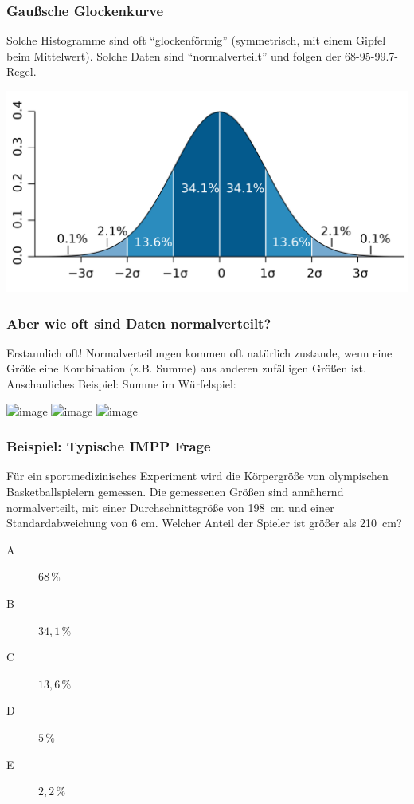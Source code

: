 \documentclass{beamer}
\begin{document}
\begin{frame}
\frametitle{Gaußsche Glockenkurve}

Solche Histogramme sind oft ``glockenförmig'' (symmetrisch, mit einem Gipfel beim Mittelwert). Solche Daten sind ``normalverteilt'' und folgen der 68-95-99.7-Regel.


\begin{center}
\includegraphics[width=\textwidth]{empirical_rule.png}
\end{center}





\end{frame}

\begin{frame}
\frametitle{Aber wie oft sind Daten normalverteilt?}

Erstaunlich oft! Normalverteilungen kommen oft natürlich zustande, wenn eine Größe eine Kombination (z.B. Summe) aus anderen zufälligen Größen ist. Anschauliches Beispiel: Summe im Würfelspiel:

\begin{center}
\includegraphics<1>[width=0.8\textwidth]{onedie.png}
\includegraphics<2>[width=0.8\textwidth]{twodice.png}
\includegraphics<3>[width=0.8\textwidth]{fivedice.png}
\end{center}



\end{frame}

\begin{frame}
\frametitle{Beispiel: Typische IMPP Frage}

Für ein sportmedizinisches Experiment wird die Körpergröße von olympischen Basketballspielern  gemessen. Die gemessenen Größen sind annähernd normalverteilt, mit einer  Durchschnittsgröße von \SI{198}{\centi\meter}  und einer Standardabweichung von 6 cm. Welcher Anteil der Spieler ist größer als \SI{210}{\centi\meter}?


\begin{description}
\item[A] \(68\,\%\) 
\item[B] \(34,1\,\%\)
\item[C] \(13,6\,\%\)
\item[D] \(5\,\%\)
\item[E] \(2,2\,\%\)
\end{description}

\end{frame}
\end{document}
